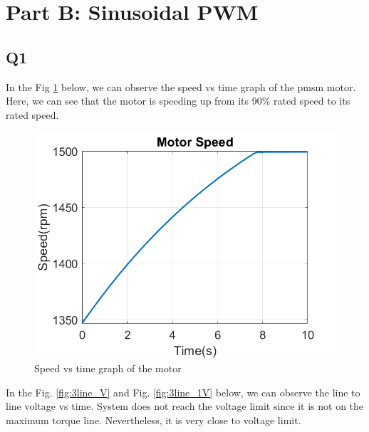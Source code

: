 \section{Part B: Sinusoidal PWM}
\subsection{Q1}

In the Fig \ref{fig:s1} below, we can observe the speed vs time graph of the pmsm motor. Here, we can see that the motor is speeding up from its 90\% rated speed to its rated speed. 

\begin{center}
\begin{figure}[H]
\centering
\includegraphics [width= 9 cm]{figs/Partb-1-hiz.png}
\caption{Speed vs time graph of the motor} 
\label{fig:s1} 
\end{figure}
\end{center}

In the Fig. \ref{fig:3line_V} and Fig. \ref{fig:3line_1V} below, we can observe the line to line voltage vs time. System does not reach the voltage limit since it is not on the maximum torque line. Nevertheless, it is very close to voltage limit.


